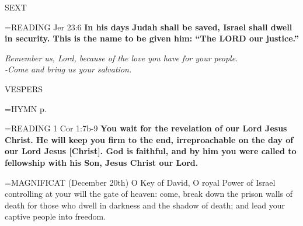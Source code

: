 \begin{flushleft}\normalsize SEXT\\\end{flushleft}

\hangindent=\parindent \small{READING} Jer 23:6 \textbf{In his days Judah shall be saved, Israel shall dwell in security. This is the name to be given him: “The LORD our justice.”}

\begin{center}
\textit{Remember us, Lord, because of the love you have for your people.\\
-Come and bring us your salvation.}
\end{center}

\begin{flushleft}\normalsize VESPERS\\\end{flushleft}

\hangindent=\parindent \small{\uppercase{HYMN} p.  \pageref{advent:firstHymn}\\}

\hangindent=\parindent \small{READING} 1 Cor 1:7b-9 \textbf{You wait for the revelation of our Lord Jesus Christ. He will keep you firm to the end, irreproachable on the day of our Lord Jesus [Christ]. God is faithful, and by him you were called to fellowship with his Son, Jesus Christ our Lord.\\}

\hangindent=\parindent \small{MAGNIFICAT  (December 20th) O Key of David, O royal Power of Israel controlling at your will the gate of heaven: come, break down the prison walls of death for those who dwell in darkness and the shadow of death; and lead your captive people into freedom.\\}
